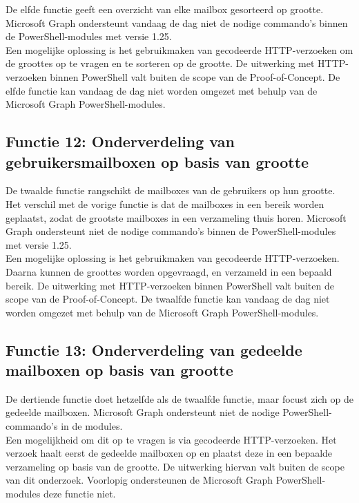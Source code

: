 De elfde functie geeft een overzicht van elke mailbox gesorteerd op grootte. Microsoft Graph ondersteunt vandaag de dag niet de nodige commando's binnen de PowerShell-modules met versie 1.25. \\ 

Een mogelijke oplossing is het gebruikmaken van gecodeerde \ac{HTTP}-verzoeken om de groottes op te vragen en te sorteren op de grootte. De uitwerking met \ac{HTTP}-verzoeken binnen PowerShell valt buiten de scope van de Proof-of-Concept. De elfde functie kan vandaag de dag niet worden omgezet met behulp van de Microsoft Graph PowerShell-modules.

\subsection{Functie 12: Onderverdeling van gebruikersmailboxen op basis van grootte}

De twaalde functie rangschikt de mailboxes van de gebruikers op hun grootte. Het verschil met de vorige functie is dat de mailboxes in een bereik worden geplaatst, zodat de grootste mailboxes in een verzameling thuis horen. Microsoft Graph ondersteunt niet de nodige commando's binnen de PowerShell-modules met versie 1.25. \\ 

Een mogelijke oplossing is het gebruikmaken van gecodeerde \ac{HTTP}-verzoeken. Daarna kunnen de groottes worden opgevraagd, en verzameld in een bepaald bereik. De uitwerking met \ac{HTTP}-verzoeken binnen PowerShell valt buiten de scope van de Proof-of-Concept. De twaalfde functie kan vandaag de dag niet worden omgezet met behulp van de Microsoft Graph PowerShell-modules.

\subsection{Functie 13: Onderverdeling van gedeelde mailboxen op basis van grootte}

De dertiende functie doet hetzelfde als de twaalfde functie, maar focust zich op de gedeelde mailboxen. Microsoft Graph ondersteunt niet de nodige PowerShell-commando's in de modules. \\

Een mogelijkheid om dit op te vragen is via gecodeerde \ac{HTTP}-verzoeken. Het verzoek haalt eerst de gedeelde mailboxen op en plaatst deze in een bepaalde verzameling op basis van de grootte. De uitwerking hiervan valt buiten de scope van dit onderzoek. Voorlopig ondersteunen de Microsoft Graph PowerShell-modules deze functie niet.

